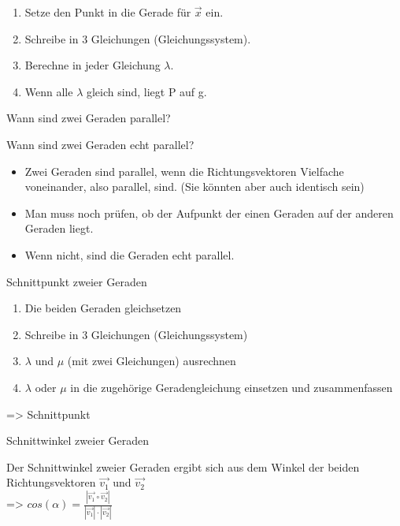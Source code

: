 \begin{antwort}\Large	
	\begin{enumerate} 
		\item Setze den Punkt in die Gerade für $\vec{x}$ ein.	
		\item Schreibe in 3 Gleichungen (Gleichungssystem).
		\item Berechne in jeder Gleichung $\lambda$.
		\item Wenn alle $\lambda$ gleich sind, liegt P auf g.
	\end{enumerate}\end{antwort}
\begin{frage}\LARGE
	Wann sind zwei Geraden parallel?
	
	Wann sind zwei Geraden echt parallel?\end{frage}
\begin{antwort}\Large	
	\begin{itemize} 
		\item Zwei Geraden sind parallel, wenn die Richtungsvektoren Vielfache voneinander, also parallel, sind.	
		(Sie könnten aber auch identisch sein)
		\item Man muss noch prüfen, ob der Aufpunkt der einen Geraden auf der anderen Geraden liegt.
		\item Wenn nicht, sind die Geraden echt parallel.
	\end{itemize}\end{antwort}
\begin{frage}\LARGE
	Schnittpunkt zweier Geraden\end{frage}
\begin{antwort}\Large	
	\begin{enumerate} 
		\item Die beiden Geraden gleichsetzen
		\item Schreibe in 3 Gleichungen (Gleichungssystem)
		\item $\lambda$ und $\mu$ (mit zwei Gleichungen) ausrechnen
		\item  $\lambda$ oder $\mu$ in die zugehörige Geradengleichung einsetzen und zusammenfassen
	\end{enumerate} 
	\bigskip
	=> Schnittpunkt\end{antwort}
\begin{frage}\LARGE
	Schnittwinkel zweier Geraden\end{frage}
\begin{antwort}\Large	
		Der Schnittwinkel zweier Geraden ergibt sich aus dem Winkel der beiden Richtungsvektoren $\vec{v_1}$ und $\vec{v_2}$ \\
		=> $cos(\alpha)=\frac{|\vec{v_1} \circ \vec{v_2}|}{|\vec{v_1}|\cdot|\vec{v_2}|}$\end{antwort}

